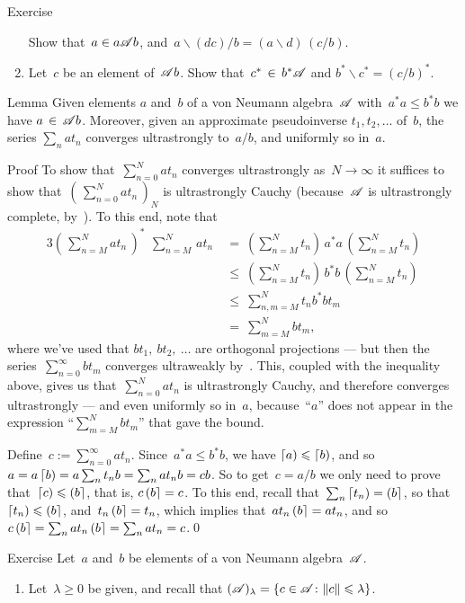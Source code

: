 \documentclass[a]{subfiles}
\begin{document}
\begin{parsec}
\begin{point}{Exercise}
\begin{enumerate}
Show that~$a\in a\mathscr{A} b$,
and~$a\backslash (dc) / b  = (a\backslash d)\,(c/b)$.
\item
Let~$c$ be an element of~$\mathscr{A} b$.
Show that~$c^* \,\in\, b^* \mathscr{A}$
and $b^*\backslash c^* = (c/b)^*$.
\end{enumerate}
\end{point}
\begin{point}{Lemma}%
Given elements $a$ and~$b$ of a von Neumann algebra~$\mathscr{A}$
with~$a^*a \leq b^*b$
we have $a\,\in\, \mathscr{A} b$.
Moreover,
given an approximate pseudoinverse $t_1,t_2,\dotsc$
of~$b$,
the series $\sum_nat_n$ converges ultrastrongly to~$a/b$,
and uniformly so in~$a$.
\begin{point}{Proof}%
To show that~$\sum_{n=0}^N at_n$
converges ultrastrongly as~$N\to \infty$
it suffices
to show that~$(\,\sum_{n=0}^N at_n\,)_N$
is ultrastrongly Cauchy
(because~$\mathscr{A}$ is ultrastrongly complete, by~).
To this end, note that
\begin{alignat*}{3}
\textstyle 
(\, \sum_{n=M}^N at_n\,)^*\ \,\sum_{n=M}^N\,at_n
\ &= \textstyle\ (\sum_{n=M}^Nt_n) \,a^*a\, (\sum_{n=M}^N t_n)
\\
\ &\leq\ \textstyle 
 (\sum_{n=M}^N t_n) \,b^*b\, (\sum_{n=M}^Nt_n)
\\
\ &\leq\ \textstyle 
\sum_{n,m=M}^N
t_nb^*bt_m 
\\
\ &=\ \textstyle 
\sum_{m=M}^N
bt_m,
\end{alignat*}
where we've used that
$bt_1,\ bt_2,\ \dotsc$
are orthogonal projections
--- but then the series~$\sum_{n=0}^\infty bt_m$
converges ultraweakly by~.
This, coupled with the
inequality above,
gives us that~$\sum_{n=0}^N at_n$
is ultrastrongly Cauchy,
and therefore converges ultrastrongly --- 
and even uniformly so in~$a$,
because~``$a$'' does not appear in
the expression
``$\sum_{m=M}^N bt_m$'' that gave the bound.

Define~$c:=\sum_{n=0}^\infty at_n$.
Since~$a^*a \leq b^*b$,
we have $\left\lceil a\right)\leqslant \left\lceil b\right)$,
and so~$a=a\left\lceil b\right) = a\sum_n t_n b = \sum_n at_n b = cb$. 
So to get~$c=a/b$
we only need to prove that~$\left\lceil c\right)\leqslant \left(b\right\rceil$,
that is, $c\left(b\right\rceil=c$.
To this end,
recall that~$\sum_n \left\lceil t_n\right)=\left(b\right\rceil$,
so that~$\left\lceil t_n\right)\leqslant \left(b\right\rceil$,
and~$t_n\left(b\right\rceil=t_n$,
which implies
that~$at_n\left(b\right\rceil=at_n$,
and so~$c\left(b\right\rceil=\sum_n at_n\left(b\right\rceil
= \sum_n at_n=c$.\qed

\end{point}
\end{point}
\begin{point}[douglas]{Exercise}%
Let~$a$ and~$b$ be elements of a von Neumann algebra~$\mathscr{A}$.
\begin{enumerate}
\item
Let~$\lambda\geq 0$ be given,
and recall that $(\mathscr{A})_\lambda 
= \{c\in\mathscr{A}\colon \|c\|\leqslant\lambda\}$.


\end{enumerate}
\end{point}
\end{parsec}
\end{document}
